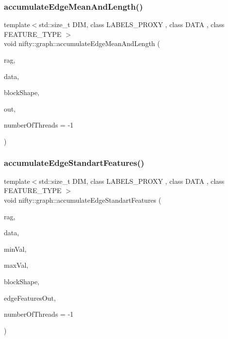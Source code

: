 \subsubsection{\texorpdfstring{accumulate\+Edge\+Mean\+And\+Length()}{accumulateEdgeMeanAndLength()}}
{\footnotesize\ttfamily template$<$std\+::size\+\_\+t D\+IM, class L\+A\+B\+E\+L\+S\+\_\+\+P\+R\+O\+XY , class D\+A\+TA , class F\+E\+A\+T\+U\+R\+E\+\_\+\+T\+Y\+PE $>$ \\
void nifty\+::graph\+::accumulate\+Edge\+Mean\+And\+Length (\begin{DoxyParamCaption}\item[{const \hyperlink{classnifty_1_1graph_1_1GridRag}{Grid\+Rag}$<$ D\+IM, L\+A\+B\+E\+L\+S\+\_\+\+P\+R\+O\+XY $>$ \&}]{rag,  }\item[{const D\+A\+TA \&}]{data,  }\item[{const \hyperlink{namespacenifty_1_1array_a683f151f19c851754e0c6d55ed16a0c2}{array\+::\+Static\+Array}$<$ int64\+\_\+t, D\+IM $>$ \&}]{block\+Shape,  }\item[{\hyperlink{classandres_1_1View}{marray\+::\+View}$<$ F\+E\+A\+T\+U\+R\+E\+\_\+\+T\+Y\+PE $>$ \&}]{out,  }\item[{const int}]{number\+Of\+Threads = {\ttfamily -\/1} }\end{DoxyParamCaption})}

\mbox{\label{namespacenifty_1_1graph_a418009772088e19eb7c14b46e6a01eb5}} 
\subsubsection{\texorpdfstring{accumulate\+Edge\+Standart\+Features()}{accumulateEdgeStandartFeatures()}}
{\footnotesize\ttfamily template$<$std\+::size\+\_\+t D\+IM, class L\+A\+B\+E\+L\+S\+\_\+\+P\+R\+O\+XY , class D\+A\+TA , class F\+E\+A\+T\+U\+R\+E\+\_\+\+T\+Y\+PE $>$ \\
void nifty\+::graph\+::accumulate\+Edge\+Standart\+Features (\begin{DoxyParamCaption}\item[{const \hyperlink{classnifty_1_1graph_1_1GridRag}{Grid\+Rag}$<$ D\+IM, L\+A\+B\+E\+L\+S\+\_\+\+P\+R\+O\+XY $>$ \&}]{rag,  }\item[{const D\+A\+TA \&}]{data,  }\item[{const double}]{min\+Val,  }\item[{const double}]{max\+Val,  }\item[{const \hyperlink{namespacenifty_1_1array_a683f151f19c851754e0c6d55ed16a0c2}{array\+::\+Static\+Array}$<$ int64\+\_\+t, D\+IM $>$ \&}]{block\+Shape,  }\item[{\hyperlink{classandres_1_1View}{marray\+::\+View}$<$ F\+E\+A\+T\+U\+R\+E\+\_\+\+T\+Y\+PE $>$ \&}]{edge\+Features\+Out,  }\item[{const int}]{number\+Of\+Threads = {\ttfamily -\/1} }\end{DoxyParamCaption})}

